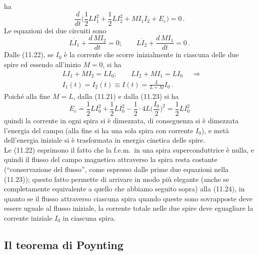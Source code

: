 \begin{enumerate}
    ha
    \begin{equation}
      \frac{d}{dt}\Big(\frac{1}{2}LI_1^2+\frac{1}{2}LI_2^2+MI_1I_2+E_c\Big)=0\,.
      \tag{11.21}
    \end{equation}
    Le equazioni dei due circuiti sono
    \begin{equation}
      L\dot I_1+\frac{d\,MI_2}{dt}=0;\qquad L\dot I_2+\frac{d\,MI_1}{dt}=0\,.
      \tag{11.22}
    \end{equation}
    Dalle (11.22), se $I_0$ \`e la corrente che scorre inizialmente in ciascuna
    delle due spire ed essendo all'inizio $M=0$, si ha
    \begin{equation}
      \begin{aligned}
        &LI_1+MI_2=LI_0;\qquad LI_2+MI_1=LI_0\quad\ \Rightarrow\\
        &I_1(t)=I_2(t)\equiv I(t)=\frac{L}{L+M}I_0\,.
      \end{aligned}
      \tag{11.23}
    \end{equation}
    Poich\'e alla fine $M=L$, dalla (11.21) e dalla (11.23) si ha
    \begin{equation}
      E_c=\frac{1}{2}LI_0^2+\frac{1}{2}LI_0^2
      -\frac{1}{2}\cdot4L\Big(\frac{I_0}{2}\Big)^2=\frac{1}{2}LI_0^2
      \tag{11.24}
    \end{equation}
    quindi la corrente in ogni spira si \`e dimezzata, di conseguenza si \`e
    dimezzata l'energia del campo (alla fine si ha una sola spira con corrente
    $I_0$), e met\`a dell'energia iniziale si \`e trasformata in energia
    cinetica delle spire.\\
    Le (11.22) esprimono il fatto che la f.e.m.\ in una spira superconduttrice
    \`e nulla, e quindi il flusso del campo magnetico attraverso la spira resta
    costante (``conservazione del flusso'', come espresso dalle prime due
    equazioni nella (11.23)); questo fatto permette di arrivare in modo pi\`u
    elegante (anche se completamente equivalente a quello che abbiamo seguito
    sopra) alla (11.24), in quanto se il flusso attraverso ciascuna spira quando
    queste sono sovrapposte deve essere uguale al flusso iniziale, la corrente
    totale nelle due spire deve eguagliare la corrente iniziale $I_0$ in
    ciascuna spira.
\end{enumerate}

\subsection{Il teorema di Poynting}

